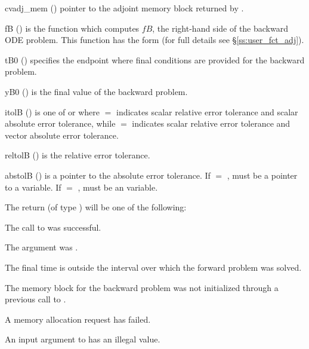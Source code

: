 {
  \begin{args}
  \item[cvadj\_mem] ()
    pointer to the adjoint memory block returned by .
  \item[fB] ()
    is the {\C} function which computes $fB$, the right-hand side of the 
    backward ODE problem. This function has the form 
     (for full details see \S\ref{ss:user_fct_adj}).
  \item[tB0] ()
    specifies the endpoint where final conditions are provided for the 
    backward problem.
  \item[yB0] ()
    is the final value of the backward problem. 
  \item[itolB] () 
    is one of  or   where $=$ indicates scalar relative error 
    tolerance and scalar absolute error tolerance, while $=$ indicates scalar
    relative error tolerance and vector absolute error tolerance. 
  \item[reltolB] ()
    is the relative error tolerance.
  \item[abstolB] ()
    is a pointer to the absolute error tolerance. If  $=$ , 
    must be a pointer to a  variable. If  $=$ , 
    must be an  variable.
  \end{args}
}
{
  The return  (of type ) will be one of the following:
  \begin{args}
  \item[\Id{CV\_SUCCESS}]
    The call to  was successful.
  \item[\Id{CV\_ADJMEM\_NULL}]
    The  argument was .
  \item[\Id{CV\_BAD\_TB0}]
    The final time  is outside the interval over which the forward problem
    was solved.
  \item[\Id{CV\_MEM\_NULL}] 
    The {\cvodes} memory block for the backward problem was not initialized through 
    a previous call to .
  \item[\Id{CV\_MEM\_FAIL}] 
    A memory allocation request has failed.
  \item[\Id{CV\_ILL\_INPUT}] 
    An input argument to  has an illegal value.
  \end{args}
}
